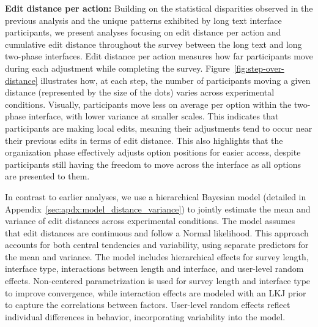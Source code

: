 \textbf{Edit distance per action:} Building on the statistical disparities observed in the previous analysis and the unique patterns exhibited by long text interface participants, we present analyses focusing on edit distance per action and cumulative edit distance throughout the survey between the long text and long two-phase interfaces. Edit distance per action measures how far participants move during each adjustment while completing the survey. Figure~\ref{fig:step-over-distance} illustrates how, at each step, the number of participants moving a given distance (represented by the size of the dots) varies across experimental conditions. Visually, participants move less on average per option within the two-phase interface, with lower variance at smaller scales. This indicates that participants are making local edits, meaning their adjustments tend to occur near their previous edits in terms of edit distance. This also highlights that the organization phase effectively adjusts option positions for easier access, despite participants still having the freedom to move across the interface as all options are presented to them.

In contrast to earlier analyses, we use a hierarchical Bayesian model (detailed in Appendix~\ref{sec:apdx:model_distance_variance}) to jointly estimate the mean and variance of edit distances across experimental conditions. The model assumes that edit distances are continuous and follow a Normal likelihood. This approach accounts for both central tendencies and variability, using separate predictors for the mean and variance. The model includes hierarchical effects for survey length, interface type, interactions between length and interface, and user-level random effects. Non-centered parametrization is used for survey length and interface type to improve convergence, while interaction effects are modeled with an LKJ prior to capture the correlations between factors. User-level random effects reflect individual differences in behavior, incorporating variability into the model.

